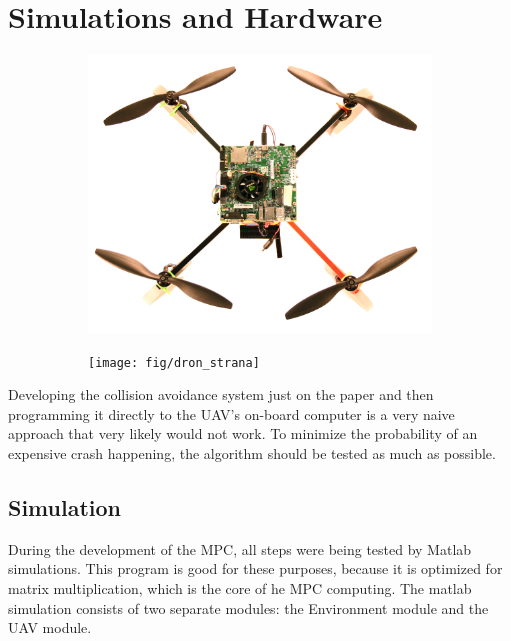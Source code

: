 \documentclass[a4paper,11pt,titlepage]{article}
\begin{document}
\section{Simulations and Hardware}
\begin{figure}[h]
\centering
\begin{subfigure}{.48\textwidth}
  \centering
  \includegraphics[width=1\linewidth]{fig/dron_up}
\end{subfigure}%
\begin{subfigure}{0.48\textwidth}
  \centering
  \texttt{[image: fig/dron\_strana]}
  \label{fig:blob}
\end{subfigure}
\end{figure}

Developing the collision avoidance system just on the paper and then programming it directly to the UAV's on-board computer is a very naive approach that very likely would not work. To minimize the probability of an expensive crash happening, the algorithm should be tested as much as possible. 


\subsection{Simulation}

During the development of the MPC, all steps were being tested by Matlab simulations. This program is good for these purposes, because it is optimized for matrix multiplication, which is the core of he MPC computing. The matlab simulation consists of two separate modules: the Environment module and the UAV module. 
\end{document}
